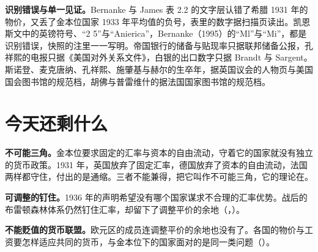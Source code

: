 \begin{deeper}[史料说明]
\textbf{识别错误与单一见证。}Bernanke 与 James 表 2.2 的文字层认错了希腊 1931 年的物价，又丢了金本位国家 1933 年平均值的负号，表里的数字据扫描页读出。凯恩斯文中的英镑符号、“2 5”与“Anierica”，Bernanke（1995）的“Ml”与“Mi”，都是识别错误，快照的注里一一写明。帝国银行的储备与贴现率只据联邦储备公报，孔祥熙的电报只据《美国对外关系文件》，白银的出口数字只据 Brandt 与 Sargent。斯诺登、麦克唐纳、孔祥熙、施肇基与赫尔的生卒年，据英国议会的人物页与美国国会图书馆的规范档，胡佛与普雷维什的据法国国家图书馆的规范档。
\end{deeper}

\section{今天还剩什么}\label{sec:depressionworld-legacy}

\textbf{不可能三角。}金本位要求固定的汇率与资本的自由流动，守着它的国家就没有独立的货币政策。1931 年，英国放弃了固定汇率，德国放弃了资本的自由流动，法国两样都守住，付出的是通缩。三者不能兼得，把它叫作不可能三角，它的理论在。

\textbf{可调整的钉住。}1936 年的声明希望没有哪个国家谋求不合理的汇率优势\cite{frb1936}。战后的布雷顿森林体系仍然钉住汇率，却留下了调整平价的余地（，）。

\textbf{不能贬值的货币联盟。}欧元区的成员连调整平价的余地也没有了。各国的物价与工资要怎样适应共同的货币，与金本位下的国家面对的是同一类问题（）。

